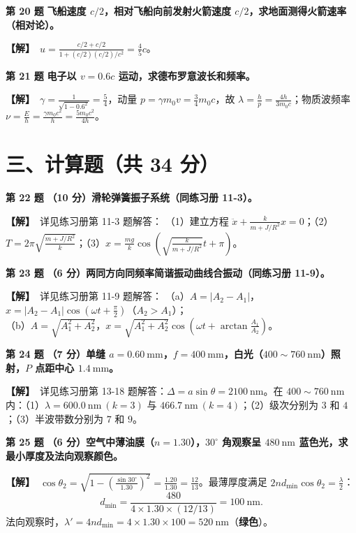 \documentclass[zihao=5,a4paper,UTF8]{ctexart}
\newenvironment{prob}[2]{%
    \par\vspace{5pt}\noindent\textbf{\color{navy}#1} \textbf{#2}\par\nopagebreak\vspace{2pt}%
}{%
    \par\vspace{3pt}%
}
\newcommand{\sol}{\noindent\textbf{\color{tealaccent}【解】}\ }
\begin{document}
\begin{prob}{第 20 题}{飞船速度 $c/2$，相对飞船向前发射火箭速度 $c/2$，求地面测得火箭速率（相对论）。}
\sol $u = \frac{c/2 + c/2}{1 + (c/2)(c/2)/c^2} = \frac{4}{5}c$。
\end{prob}

\begin{prob}{第 21 题}{电子以 $v = 0.6c$ 运动，求德布罗意波长和频率。}
\sol $\gamma = \frac{1}{\sqrt{1-0.6^2}} = \frac{5}{4}$，动量 $p = \gamma m_0 v = \frac{3}{4}m_0 c$，故 $\lambda = \frac{h}{p} = \frac{4h}{3m_0c}$；物质波频率 $\nu = \frac{E}{h} = \frac{\gamma m_0c^2}{h} = \frac{5m_0c^2}{4h}$。
\end{prob}

\section*{三、计算题（共 34 分）}

\begin{prob}{第 22 题}{（10 分）滑轮弹簧振子系统（同练习册 11-3）。}
\sol 详见练习册第 11-3 题解答：
（1）建立方程 $\ddot{x} + \frac{k}{m + J/R^2}x = 0$；（2）$T = 2\pi\sqrt{\frac{m+J/R^2}{k}}$；（3）$x = \frac{mg}{k}\cos\left(\sqrt{\frac{k}{m+J/R^2}}t + \pi\right)$。
\end{prob}

\begin{prob}{第 23 题}{（6 分）两同方向同频率简谐振动曲线合振动（同练习册 11-9）。}
\sol 详见练习册第 11-9 题解答：
（a）$A = |A_2 - A_1|$，$x = |A_2 - A_1|\cos\left(\omega t + \frac{\pi}{2}\right)$（$A_2 > A_1$）；\\
（b）$A = \sqrt{A_1^2 + A_2^2}$，$x = \sqrt{A_1^2 + A_2^2}\cos\left(\omega t + \arctan\frac{A_1}{A_2}\right)$。
\end{prob}

\begin{prob}{第 24 题}{（7 分）单缝 $a=0.60\ \mathrm{mm}$，$f=400\ \mathrm{mm}$，白光（$400\sim 760\ \mathrm{nm}$）照射，$P$ 点距中心 $1.4\ \mathrm{mm}$。}
\sol 详见练习册第 13-18 题解答：$\Delta = a\sin\theta = 2100\ \mathrm{nm}$。在 $400\sim 760\ \mathrm{nm}$ 内：（1）$\lambda = 600.0\ \mathrm{nm}\ (k=3)$ 与 $466.7\ \mathrm{nm}\ (k=4)$；（2）级次分别为 $3$ 和 $4$；（3）半波带数分别为 $7$ 和 $9$。
\end{prob}

\begin{prob}{第 25 题}{（6 分）空气中薄油膜（$n=1.30$），$30^\circ$ 角观察呈 $480\ \mathrm{nm}$ 蓝色光，求最小厚度及法向观察颜色。}
\sol $\cos\theta_2 = \sqrt{1 - \left(\frac{\sin 30^\circ}{1.30}\right)^2} = \frac{1.20}{1.30} = \frac{12}{13}$。最薄厚度满足 $2nd_{\min}\cos\theta_2 = \frac{\lambda}{2}$：
\[
    d_{\min} = \frac{480}{4\times 1.30\times (12/13)} = 100\ \mathrm{nm}.
\]
法向观察时，$\lambda' = 4nd_{\min} = 4\times 1.30\times 100 = 520\ \mathrm{nm}$（\textbf{绿色}）。
\end{prob}
\end{document}
